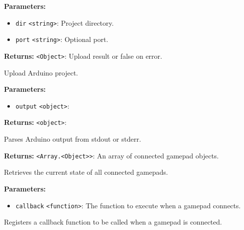 \documentclass[12pt,a4paper]{article}
\begin{document}
\noindent \textbf{Parameters:}
\begin{itemize}
  \item \texttt{dir} \texttt{<string>}: Project directory.
  \item \texttt{port} \texttt{<string>}: Optional port.
\end{itemize}

\noindent \textbf{Returns:} \texttt{<Object>}: Upload result or false on error.

\noindent Upload Arduino project.

\vspace{5mm}
\noindent {}


\noindent \textbf{Parameters:}
\begin{itemize}
  \item \texttt{output} \texttt{<object>}:
\end{itemize}

\noindent \textbf{Returns:} \texttt{<object>}:

\noindent Parses Arduino output from stdout or stderr.

\vspace{5mm}
\noindent {}


\noindent \textbf{Returns:} \texttt{<Array.<Object>>}: An array of connected gamepad objects.

\noindent Retrieves the current state of all connected gamepads.

\vspace{5mm}
\noindent {}


\noindent \textbf{Parameters:}
\begin{itemize}
  \item \texttt{callback} \texttt{<function>}: The function to execute when a gamepad connects.
\end{itemize}

\noindent Registers a callback function to be called when a gamepad is connected.

\vspace{5mm}
\noindent {}
\end{document}
